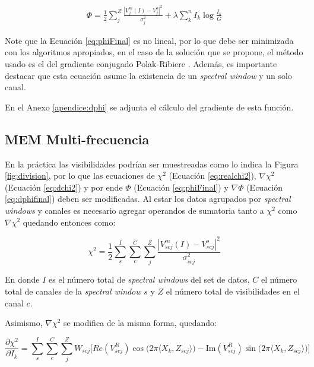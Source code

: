 \begin{align}
	\label{eq:phiFinal}
	\Phi = \frac{1}{2}\sum_j^{Z}{{\frac{|V^m_j(I)-V^o_j|^2}{\sigma_j^2}} + \lambda \sum_k^{n}{I_k \log{\frac{I_k}{G}}}}
\end{align}


Note que la Ecuación \ref{eq:phiFinal} es no lineal, por lo que debe ser minimizada con los algoritmos apropiados, en el caso de la solución que se propone, el método usado es el del gradiente conjugado Polak-Ribiere \citep{polak}. Además, es importante destacar que esta ecuación asume la existencia de un \textit{spectral window} y un solo canal.

En el Anexo \ref{apendice:dphi} se adjunta el cálculo del gradiente de esta función.

\subsection{MEM Multi-frecuencia}

En la práctica las visibilidades podrían ser muestreadas como lo indica la Figura \ref{fig:division}, por lo que las ecuaciones de $\chi^{2}$ (Ecuación \ref{eq:realchi2}), $\nabla \chi^{2}$ (Ecuación \ref{eq:dchi2}) y por ende $\Phi$ (Ecuación \ref{eq:phiFinal}) y $\nabla \Phi$ (Ecuación \ref{eq:dphifinal}) deben ser modificadas. Al estar los datos agrupados por \textit{spectral windows} y canales es necesario agregar operandos de sumatoria tanto a $\chi^{2}$ como $\nabla \chi^{2}$ quedando entonces como:

\begin{equation}
	\chi^{2} = \frac{1}{2}\sum_{s}^{I}\sum_{c}^{C}\sum_{j}^{Z}\frac{|V^m_{scj}(I)-V^o_{scj}|^2}{\sigma_{scj}^2}
	\label{eq:chi2-multi}
\end{equation}

En donde $I$ es el número total de \textit{spectral windows} del set de datos, $C$ el número total de canales de la \textit{spectral window} $s$ y $Z$ el número total de visibilidades en el canal $c$.

Asimismo, $\nabla \chi^{2}$ se modifica de la misma forma, quedando:

\begin{equation}
	\frac{\partial\chi^{2}}{\partial I_{k}} = \sum_{s}^{I}\sum_{c}^{C}\sum_{j}^{Z} W_{scj}\biggl[Re(V_{scj}^{R})\cos\bigl(2\pi \langle X_k,Z_{scj}\rangle\bigr)-\text{Im}(V_{scj}^{R})\sin\bigl(2\pi \langle X_k,Z_{scj}\rangle\bigr)\biggr]
	\label{eq:dchi2-multi}
\end{equation}

